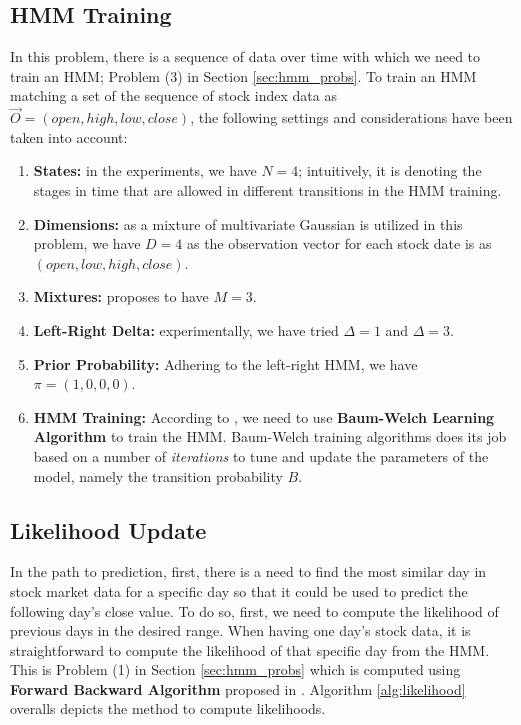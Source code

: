 \documentclass{acm_proc_article-sp}
\begin{document}
\subsection{HMM Training} \label{sec:train}
In this problem, there is a sequence of data over time with which we need to train an HMM; Problem (3) in Section
\ref{sec:hmm_probs}. To train an HMM matching a set of the sequence of stock index data as $\vec{O} = (open, high, low,
close)$, the following settings and considerations have been taken into account:
\begin{enumerate}
  \item \textbf{States:} in the experiments, we have $N = 4$; intuitively, it is denoting the stages in time that are
  allowed in different transitions in the HMM training.
  \item \textbf{Dimensions:} as a mixture of multivariate Gaussian is utilized in this problem, we have $D = 4$ as the
  observation vector for each stock date is as $(open, low, high, close)$.
  \item \textbf{Mixtures:} \cite{hassan:hmm_stock} proposes to have $M = 3$.
  \item \textbf{Left-Right Delta:} experimentally, we have tried $\Delta = 1$ and $\Delta = 3$.
  \item \textbf{Prior Probability:} Adhering to the left-right HMM, we have $\pi = (1, 0, 0, 0)$.
  \item \textbf{HMM Training:} According to \cite{hassan:hmm_stock,rabiner:hmm}, we need to use \textbf{Baum-Welch
  Learning Algorithm} to train the HMM. Baum-Welch training algorithms does its job based on a number of
  \textit{iterations} to tune and update the parameters of the model, namely the transition probability $B$. 
\end{enumerate}

\subsection{Likelihood Update} \label{sec:likelihood}
In the path to prediction, first, there is a need to find the most similar day in stock market data for a specific day
so that it could be used to predict the following day's close value. To do so, first, we need to compute the
likelihood of previous days in the desired range. When having one day's stock data, it is straightforward to compute
the likelihood of that specific day from the HMM. This is Problem (1) in Section \ref{sec:hmm_probs} which is computed using
\textbf{Forward Backward Algorithm} proposed in \cite{rabiner:hmm,erwin:datamining,wiki:hmm}. Algorithm
\ref{alg:likelihood} overalls depicts the method to compute likelihoods.
\end{document}
